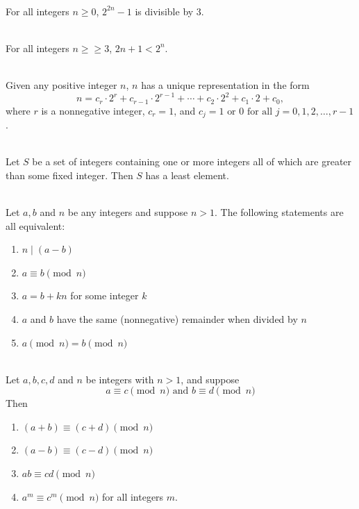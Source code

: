 \documentclass[12pt]{article}
\begin{document}
\begin{proposition}[5.3.1]
\hfill\\
\normalfont For all integers $n \geq 0$, $2^{2n} - 1$ is divisible by 3.
\end{proposition}
\begin{proposition}[5.3.2]
\hfill\\
\normalfont For all integers $n ≥\geq 3$, $2n + 1 < 2^n$.
\end{proposition}
\begin{theorem}[5.4.1]
\hfill\\
\normalfont Given any positive integer $n$, $n$ has a unique representation in the form
\[n = c_r \cdot 2^r + c_{r-1} \cdot 2^{r-1} +\cdots+ c_2 ·2^2 + c_1 \cdot 2 + c_0,\]
where $r$ is a nonnegative integer, $c_r = 1$, and $c_j = 1 \text{ or }0 \text{ for all }j = 0, 1, 2,\ldots,r - 1$.
\end{theorem}
\begin{theorem}
\hfill\\
\normalfont Let $S$ be a set of integers containing one or more integers all of which are greater
than some fixed integer. Then $S$ has a least element.
\end{theorem}
\begin{theorem}[8.4.1]
\hfill\\
\normalfont Let $a, b$ and $n$ be any integers and suppose $n > 1$. The following statements are all
equivalent:
\begin{enumerate}
\item $n \mid(a - b)$
\item $a \equiv b \pmod{n}$
\item $a = b + kn$ for some integer $k$
\item $a$ and $b$ have the same (nonnegative) remainder when divided by $n$
\item $a \pmod{n}= b\pmod{n}$
\end{enumerate}
\end{theorem}
\begin{theorem}[8.4.3]
\hfill\\
\normalfont Let $a, b, c, d$ and $n$ be integers with $n > 1$, and suppose
\[a \equiv c \pmod{n} \text{ and } b \equiv d \pmod{n}\]
Then
\begin{enumerate}
\item $(a + b) \equiv (c + d) \pmod{n}$
\item $(a - b) \equiv (c - d) \pmod{n}$
\item $ab \equiv cd \pmod{n}$
\item $a^m \equiv c^m \pmod{n}$ for all integers $m$.
\end{enumerate}
\end{theorem}
\end{document}
